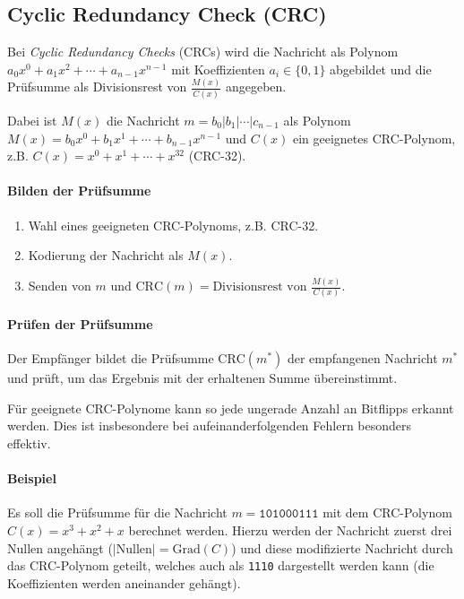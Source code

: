 	\subsection{Cyclic Redundancy Check (CRC)}
		Bei \textit{Cyclic Redundancy Checks} (CRCs)  wird die Nachricht als Polynom \( a_0x^0 + a_1x^2 + \cdots + a_{n-1}x^{n-1} \) mit Koeffizienten \( a_i \in \{0,1\} \) abgebildet und die Prüfsumme als Divisionsrest von \( \frac{M(x)}{C(x)} \) angegeben.

		Dabei ist \( M(x) \) die Nachricht \( m = b_0 \vert b_1 \vert \cdots \vert c_{n-1} \) als Polynom \( M(x) = b_0x^0 + b_1x^1 + \cdots + b_{n-1}x^{n-1} \) und \(C(x)\) ein geeignetes CRC-Polynom, z.B. \( C(x) = x^0 + x^1 + \cdots + x^32 \) (CRC-32).

		\paragraph{Bilden der Prüfsumme}
			\begin{enumerate}
				\item Wahl eines geeigneten CRC-Polynoms, z.B. CRC-32.
				\item Kodierung der Nachricht als \( M(x) \).
				\item Senden von \(m\) und \( \textrm{CRC}(m) = \textrm{Divisionsrest von } \frac{M(x)}{C(x)} \).
			\end{enumerate}

		\paragraph{Prüfen der Prüfsumme}
			Der Empfänger bildet die Prüfsumme \( \textrm{CRC}(m^*) \) der empfangenen Nachricht \( m^* \) und prüft, um das Ergebnis mit der erhaltenen Summe übereinstimmt.

			Für geeignete CRC-Polynome kann so jede ungerade Anzahl an Bitflipps erkannt werden. Dies ist insbesondere bei aufeinanderfolgenden Fehlern besonders effektiv.

		\paragraph{Beispiel}
			Es soll die Prüfsumme für die Nachricht \( m = \texttt{101000111} \) mit dem CRC-Polynom \( C(x) = x^3 + x^2 + x \) berechnet werden. Hierzu werden der Nachricht zuerst drei Nullen angehängt (\( \lvert\text{Nullen}\rvert = \text{Grad}(C) \)) und diese modifizierte Nachricht durch das CRC-Polynom geteilt, welches auch als \texttt{1110} dargestellt werden kann (die Koeffizienten werden aneinander gehängt).

